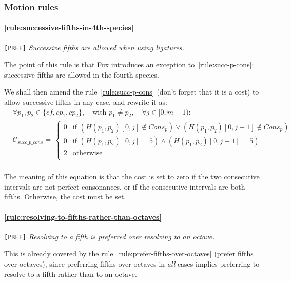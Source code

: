 \subsubsection{Motion rules}
\paragraph{\hspace{.6cm}\ref{rule:successive-fifths-in-4th-species}} \texttt{[PREF]} \textit{Successive fifths are allowed when using ligatures.}    

    The point of this rule is that Fux introduces an exception to~\ref{rule:succ-p-cons}: successive fifths are allowed in the fourth species.

    We shall then amend the rule~\ref{rule:succ-p-cons} (don't forget that it is a cost) to allow successive fifths in any case, and rewrite it as:
    \begin{equation} \begin{aligned}
        &\forall p_1, p_2 \in \{\mathit{cf}, cp_1, cp_2\}, \quad \text{with } p_1 \neq p_2, \quad \forall j \in [0, m-1) \colon\\
        &\mathcal{C}_{succ\_p\_cons} = \,  
        \begin{cases}
            0 & \text{if } (H(p_1, p_2)[0, j] \notin Cons_p) \lor (H(p_1, p_2)[0, j+1] \notin Cons_p)\\
            0 & \text{if } (H(p_1, p_2)[0, j] = 5 ) \land (H(p_1, p_2)[0, j+1] = 5) \\
            2 & \text{otherwise } \\
        \end{cases}\\
    \end{aligned} \end{equation}

    The meaning of this equation is that the cost is set to zero if the two consecutive intervals are not perfect consonances, or if the consecutive intervals are both fifths. Otherwise, the cost must be set.

    \paragraph{\hspace{.6cm}\ref{rule:resolving-to-fifths-rather-than-octaves}} \texttt{[PREF]} \textit{Resolving to a fifth is preferred over resolving to an octave.}    
    
    This is already covered by the rule~\ref{rule:prefer-fifths-over-octaves} (prefer fifths over octaves), since preferring fifths over octaves in \textit{all} cases implies preferring to resolve to a fifth rather than to an octave.

